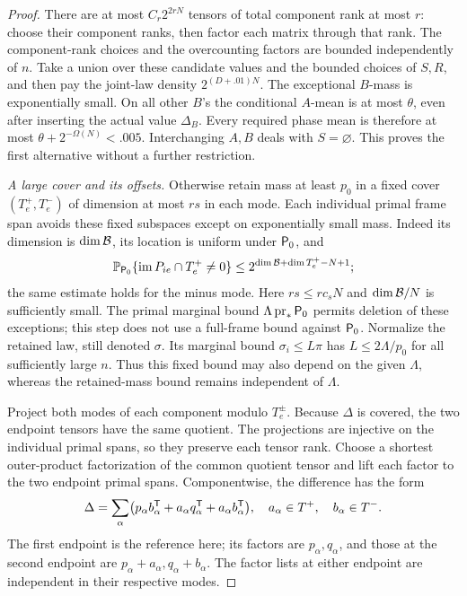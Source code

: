 \begin{proof}
There are at most \(C_r2^{2rN}\) tensors of total component rank
at most \(r\): choose their component ranks, then factor each
matrix through that rank.  The component-rank choices and the
overcounting factors are bounded independently of \(n\).
Take a union over these candidate values and the bounded choices
of \(S,R\), and then pay the joint-law density
\(2^{(D+.01)N}\).  The exceptional \(B\)-mass is exponentially
small.  On all other \(B\)'s the conditional \(A\)-mean is at most
\(\theta\), even after inserting the actual value \(\Delta_B\).
Every required phase mean is therefore at most
\(\theta+2^{-\Omega(N)}<.005\).  Interchanging \(A,B\) deals
with \(S=\varnothing\).  This proves the first alternative
without a further restriction.

\medskip\noindent
\emph{A large cover and its offsets.}
Otherwise retain mass at least \(p_0\) in a fixed cover
\((T_e^+,T_e^-)\) of dimension at most \(rs\) in each mode.
Each individual primal frame span avoids these fixed subspaces
except on exponentially small mass.  Indeed its dimension is
\(\dim\mathcal B\), its location is uniform under \({\mathsf P_0}\), and
\[
 \mathbb P_{{\mathsf P_0}}\{\operatorname{im} P_{ie}\cap T_e^+\ne0\}
 \le 2^{\dim\mathcal B+\dim T_e^+-N+1};
\]
the same estimate holds for the minus mode.  Here
\(rs\le rc_sN\) and \(\dim\mathcal B/N\) is sufficiently small.
The primal marginal bound \(\Lambda\operatorname{pr}_*{\mathsf P_0}\) permits
deletion of these exceptions; this step does not use a full-frame
bound against \({\mathsf P_0}\).  Normalize the retained law, still denoted \(\sigma\).
Its marginal bound \(\sigma_i\le L\pi\) has
\(L\le2\Lambda/p_0\) for all sufficiently large \(n\).
Thus this fixed bound may also depend on the given \(\Lambda\),
whereas the retained-mass bound remains independent of \(\Lambda\).

Project both modes of each component modulo \(T_e^\pm\).
Because \(\Delta\) is covered, the two endpoint tensors have the
same quotient.  The projections are injective on the individual
primal spans, so they preserve each tensor rank.  Choose a shortest
outer-product factorization of the common quotient tensor and
lift each factor to the two endpoint primal spans.  Componentwise,
the difference has the form
\begin{equation}
 \Delta=\sum_\alpha
   \bigl(p_\alpha b_\alpha^{\mathsf T}+
         a_\alpha q_\alpha^{\mathsf T}+
         a_\alpha b_\alpha^{\mathsf T}\bigr),
 \quad
 a_\alpha\in T^+,\quad b_\alpha\in T^- .
 \label{eq:cover-lifting}
\end{equation}
The first endpoint is the reference here; its factors are
\(p_\alpha,q_\alpha\), and those at the second endpoint are
\(p_\alpha+a_\alpha,q_\alpha+b_\alpha\).
The factor lists at either endpoint are independent in their
respective modes.


\end{proof}
